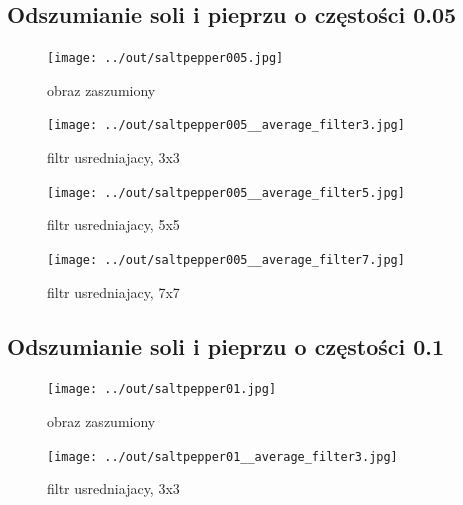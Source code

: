 \documentclass[a4paper,12pt]{article}
\begin{document}
\subsection{Odszumianie soli i pieprzu o częstości 0.05}
\begin{figure}[h!]
\begin{minipage}[t]{7.5cm}
\begin{center}
\texttt{[image: ../out/saltpepper005.jpg]}
\caption{obraz zaszumiony}
\end{center}
\end{minipage}
\hfill
\begin{minipage}[t]{7.5cm}
\begin{center}
\texttt{[image: ../out/saltpepper005\_\_average\_filter3.jpg]}
\caption{filtr usredniajacy, 3x3}
\end{center}
\end{minipage}
\end{figure}

\begin{figure}[h!]
\begin{minipage}[t]{7.5cm}
\begin{center}
\texttt{[image: ../out/saltpepper005\_\_average\_filter5.jpg]}
\caption{filtr usredniajacy, 5x5}
\end{center}
\end{minipage}
\hfill
\begin{minipage}[t]{7.5cm}
\begin{center}
\texttt{[image: ../out/saltpepper005\_\_average\_filter7.jpg]}
\caption{filtr usredniajacy, 7x7}
\end{center}
\end{minipage}
\end{figure}


\newpage
\subsection{Odszumianie soli i pieprzu o częstości 0.1}
\begin{figure}[h!]
\begin{minipage}[t]{7.5cm}
\begin{center}
\texttt{[image: ../out/saltpepper01.jpg]}
\caption{obraz zaszumiony}
\end{center}
\end{minipage}
\hfill
\begin{minipage}[t]{7.5cm}
\begin{center}
\texttt{[image: ../out/saltpepper01\_\_average\_filter3.jpg]}
\caption{filtr usredniajacy, 3x3}
\end{center}
\end{minipage}
\end{figure}
\end{document}
